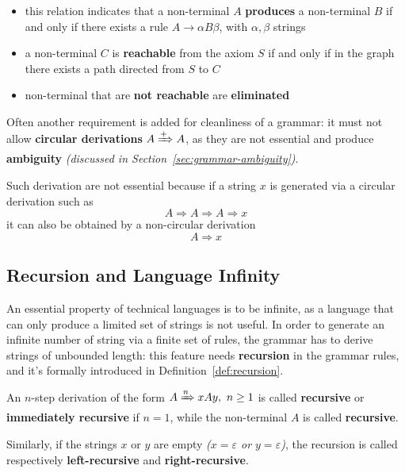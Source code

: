 \documentclass[english]{article}
\begin{document}
\begin{enumerate}[label=step \arabic*., ref=(step \arabic*), labelindent=1em, leftmargin=*, widest=step 2.]
        \begin{itemize}
          \item this relation indicates that a non-terminal \(A\) \textbf{produces} a non-terminal \(B\) if and only if there exists a rule \(A \rightarrow \alpha B \beta\), with \(\alpha, \beta\) strings
          \item a non-terminal \(C\) is \textbf{reachable} from the axiom \(S\) if and only if in the graph there exists a path directed from \(S\) to \(C\)
          \item non-terminal that are \textbf{not reachable} are \textbf{eliminated}
        \end{itemize}
\end{enumerate}

\bigskip
Often another requirement is added for cleanliness of a grammar: it must not allow \textbf{circular derivations} \(A \xRightarrow{+} A\), as they are not essential and produce \textbf{ambiguity} \textit{(discussed in Section~\ref{sec:grammar-ambiguity})}.

Such derivation are not essential because if a string \(x\) is generated via a circular derivation such as
\[ A \Rightarrow A \Rightarrow A \Rightarrow x \]
it can also be obtained by a non-circular derivation
\[ A \Rightarrow x \]

\subsection{Recursion and Language Infinity}

An essential property of technical languages is to be infinite, as a language that can only produce a limited set of strings is not useful.
In order to generate an infinite number of string via a finite set of rules, the grammar has to derive strings of unbounded length:
this feature needs \textbf{recursion} in the grammar rules, and it's formally introduced in Definition~\ref{def:recursion}.

\begin{definition}[Recursion]
  \label{def:recursion}
  An \(n\)-step derivation of the form \(A \xRightarrow{n} x A y, \ n \geq 1\) is called \textbf{recursive} or \textbf{immediately recursive} if \(n=1\), while the non-terminal \(A\) is called \textbf{recursive}.

  Similarly, if the strings \(x\) or \(y\) are empty \textit{(\(x=\varepsilon\) or \(y=\varepsilon\))}, the recursion is called respectively \textbf{left-recursive} and \textbf{right-recursive}.
\end{definition}
\end{document}
